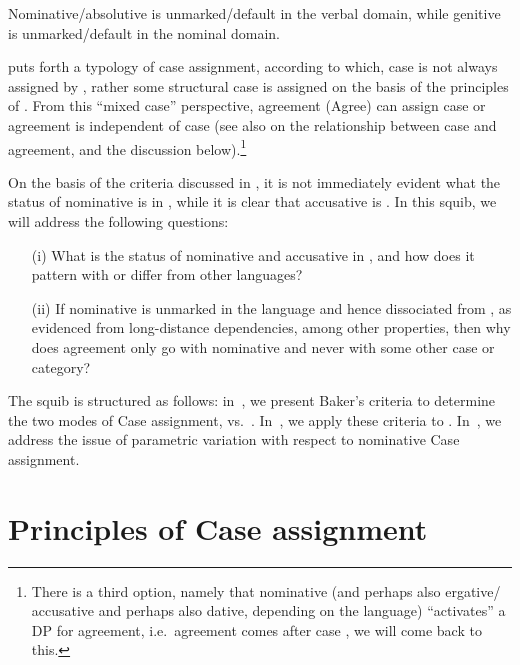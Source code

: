 \documentclass[output=paper]{langsci/langscibook}
\begin{document}
Nominative/absolutive is unmarked/default in the verbal domain, while genitive
is unmarked/default in the nominal domain.

\citet{Baker2015} puts forth a typology of case assignment, according to which,
case is not always assigned by , rather some structural case is
assigned on the basis of the principles of . From this
\enquote{mixed case} perspective, agreement (Agree) can assign case or
agreement is independent of case (see also \citealt{Baker2008} on the
relationship between case and agreement, and the discussion
below).\footnote{There is a third option, namely that nominative (and perhaps also ergative/ accusative and perhaps also dative, depending
on the language) \enquote{activates} a DP for agreement, i.e.\  agreement comes
after case \citep{Bobaljik2008}, we will come back to this.}

On the basis of the criteria discussed in \textcite{Baker2008,Baker2015}, it is
not immediately evident what the status of nominative is in , while it is
clear that accusative is . In this squib, we will address the
following questions:

\begin{itemize}

    \item[(i)] What is the status of nominative and accusative in , and
        how does it pattern with or differ from other languages?

    \item[(ii)] If nominative is unmarked in the language
        and hence dissociated from , as evidenced from long-distance
        dependencies, among other properties, then why does agreement only go
        with nominative and never with some other case or
        category?

\end{itemize}

The squib is structured as follows: in~, we
present Baker’s criteria to determine the two modes of Case assignment,
 vs.\ . In~, we apply these
criteria to .  In~, we address the issue of
parametric variation with respect to nominative Case
assignment.

\section{Principles of Case assignment}\label{sec:key:13.2}
\end{document}
